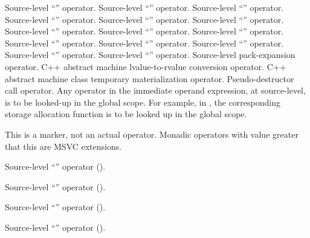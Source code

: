  Source-level ``'' operator.
 Source-level ``'' operator.
 Source-level ``'' operator.
 Source-level ``'' operator.
 Source-level ``'' operator.
 Source-level ``'' operator.
 Source-level ``'' operator.
 Source-level ``'' operator.
 Source-level ``'' operator.
 Source-level ``'' operator.
 Source-level ``'' operator.
 Source-level ``'' operator.
 Source-level ``'' operator.
 Source-level ``'' operator.
 Source-level pack-expansion operator.
 C++ abstract machine lvalue-to-rvalue conversion operator.
 C++ abstract machine class temporary materialization operator.
 Pseudo-destructor call operator.
 Any operator in the immediate operand expression, at source-level, is to be looked-up in the global scope.  For example, in , the corresponding storage allocation function  is to be looked up in the global scope.

 This is a marker, not an actual operator. Monadic operators with 
value greater that this are MSVC extensions.

Source-level ``'' operator ().

 Source-level ``'' operator ().

 Source-level ``'' operator ().

 Source-level ``'' operator ().


